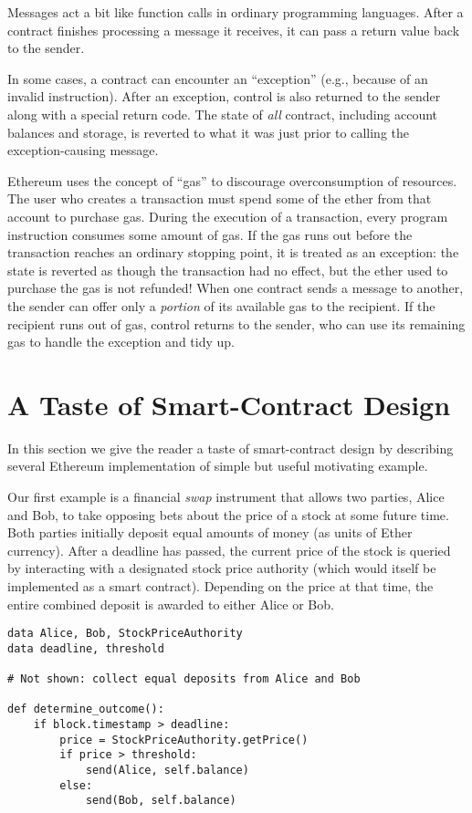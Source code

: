 \documentclass[10pt,twocolumn,letterpaper]{article}
\begin{document}
Messages act a bit like function calls in ordinary programming languages. After a contract finishes processing a message it receives, it can pass a return value back to the sender.

In some cases, a contract can encounter an ``exception'' (e.g., because of an invalid instruction). After an exception, control is also returned to the sender along with a special return code. The state of \emph{all} contract, including account balances and storage, is reverted to what it was just prior to calling the exception-causing message.

Ethereum uses the concept of ``gas'' to discourage overconsumption of resources. The user who creates a transaction must spend some of the ether from that account to purchase gas. During the execution of a transaction, every program instruction consumes some amount of gas. If the gas runs out before the transaction reaches an ordinary stopping point, it is treated as an exception: the state is reverted as though the transaction had no effect, but the ether used to purchase the gas is not refunded! When one contract sends a message to another, the sender can offer only a \emph{portion} of its available gas to the recipient. If the recipient runs out of gas, control returns to the sender, who can use its remaining gas to handle the exception and tidy up.


\section{A Taste of Smart-Contract Design}

In this section we give the reader a taste of smart-contract design by describing several Ethereum implementation of simple but useful motivating example. 

Our first example is a financial \emph{swap} instrument that allows two parties, Alice and Bob, to take opposing bets about the price of a stock at some future time. Both parties initially deposit equal amounts of money (as units of Ether currency). After a deadline has passed, the current price of the stock is queried by interacting with a designated stock price authority (which would itself be implemented as a smart contract). Depending on the price at that time, the entire combined deposit is awarded to either Alice or Bob.

\begin{mdframed}
\begin{verbatim}
data Alice, Bob, StockPriceAuthority
data deadline, threshold

# Not shown: collect equal deposits from Alice and Bob

def determine_outcome():
    if block.timestamp > deadline: 
        price = StockPriceAuthority.getPrice()
        if price > threshold:
            send(Alice, self.balance)
        else:
            send(Bob, self.balance)
\end{verbatim}
\end{mdframed}
\end{document}
